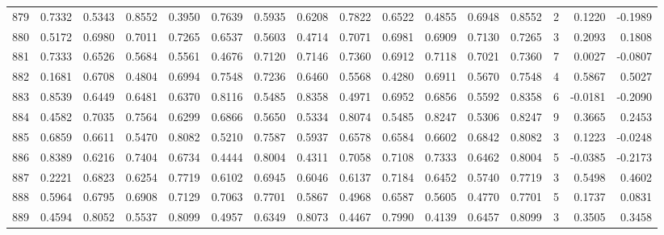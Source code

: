\begin{tabular}{lrrrrrrrrrrrrrrr}
879 &      0.7332 &  0.5343 &  0.8552 &  0.3950 &  0.7639 &  0.5935 &  0.6208 &  0.7822 &  0.6522 &  0.4855 &   0.6948 &     0.8552 &      2 &                    0.1220 &                    -0.1989 \\
880 &      0.5172 &  0.6980 &  0.7011 &  0.7265 &  0.6537 &  0.5603 &  0.4714 &  0.7071 &  0.6981 &  0.6909 &   0.7130 &     0.7265 &      3 &                    0.2093 &                     0.1808 \\
881 &      0.7333 &  0.6526 &  0.5684 &  0.5561 &  0.4676 &  0.7120 &  0.7146 &  0.7360 &  0.6912 &  0.7118 &   0.7021 &     0.7360 &      7 &                    0.0027 &                    -0.0807 \\
882 &      0.1681 &  0.6708 &  0.4804 &  0.6994 &  0.7548 &  0.7236 &  0.6460 &  0.5568 &  0.4280 &  0.6911 &   0.5670 &     0.7548 &      4 &                    0.5867 &                     0.5027 \\
883 &      0.8539 &  0.6449 &  0.6481 &  0.6370 &  0.8116 &  0.5485 &  0.8358 &  0.4971 &  0.6952 &  0.6856 &   0.5592 &     0.8358 &      6 &                   -0.0181 &                    -0.2090 \\
884 &      0.4582 &  0.7035 &  0.7564 &  0.6299 &  0.6866 &  0.5650 &  0.5334 &  0.8074 &  0.5485 &  0.8247 &   0.5306 &     0.8247 &      9 &                    0.3665 &                     0.2453 \\
885 &      0.6859 &  0.6611 &  0.5470 &  0.8082 &  0.5210 &  0.7587 &  0.5937 &  0.6578 &  0.6584 &  0.6602 &   0.6842 &     0.8082 &      3 &                    0.1223 &                    -0.0248 \\
886 &      0.8389 &  0.6216 &  0.7404 &  0.6734 &  0.4444 &  0.8004 &  0.4311 &  0.7058 &  0.7108 &  0.7333 &   0.6462 &     0.8004 &      5 &                   -0.0385 &                    -0.2173 \\
887 &      0.2221 &  0.6823 &  0.6254 &  0.7719 &  0.6102 &  0.6945 &  0.6046 &  0.6137 &  0.7184 &  0.6452 &   0.5740 &     0.7719 &      3 &                    0.5498 &                     0.4602 \\
888 &      0.5964 &  0.6795 &  0.6908 &  0.7129 &  0.7063 &  0.7701 &  0.5867 &  0.4968 &  0.6587 &  0.5605 &   0.4770 &     0.7701 &      5 &                    0.1737 &                     0.0831 \\
889 &      0.4594 &  0.8052 &  0.5537 &  0.8099 &  0.4957 &  0.6349 &  0.8073 &  0.4467 &  0.7990 &  0.4139 &   0.6457 &     0.8099 &      3 &                    0.3505 &                     0.3458 \\

\end{tabular}
